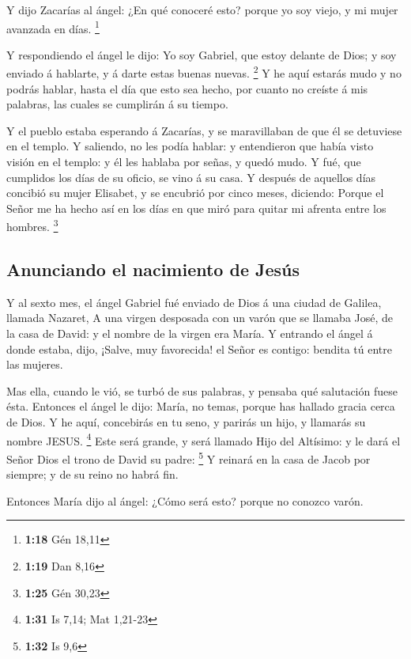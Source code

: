  Y dijo Zacarías al ángel: ¿En qué conoceré esto? porque yo
soy viejo, y mi mujer avanzada en días. \footnote{\textbf{1:18} Gén
  18,11}

 Y respondiendo el ángel le dijo: Yo soy Gabriel, que estoy
delante de Dios; y soy enviado á hablarte, y á darte estas buenas
nuevas. \footnote{\textbf{1:19} Dan 8,16}  Y he aquí
estarás mudo y no podrás hablar, hasta el día que esto sea hecho, por
cuanto no creíste á mis palabras, las cuales se cumplirán á su tiempo.

 Y el pueblo estaba esperando á Zacarías, y se maravillaban
de que él se detuviese en el templo.  Y saliendo, no les
podía hablar: y entendieron que había visto visión en el templo: y él
les hablaba por señas, y quedó mudo.  Y fué, que cumplidos
los días de su oficio, se vino á su casa.  Y después de
aquellos días concibió su mujer Elisabet, y se encubrió por cinco meses,
diciendo:  Porque el Señor me ha hecho así en los días en
que miró para quitar mi afrenta entre los hombres. \footnote{\textbf{1:25}
  Gén 30,23}

\hypertarget{anunciando-el-nacimiento-de-jesuxfas}{%
\subsection{Anunciando el nacimiento de
Jesús}\label{anunciando-el-nacimiento-de-jesuxfas}}

 Y al sexto mes, el ángel Gabriel fué enviado de Dios á una
ciudad de Galilea, llamada Nazaret,  A una virgen desposada
con un varón que se llamaba José, de la casa de David: y el nombre de la
virgen era María.  Y entrando el ángel á donde estaba,
dijo, ¡Salve, muy favorecida! el Señor es contigo: bendita tú entre las
mujeres.

 Mas ella, cuando le vió, se turbó de sus palabras, y
pensaba qué salutación fuese ésta.  Entonces el ángel le
dijo: María, no temas, porque has hallado gracia cerca de Dios.
 Y he aquí, concebirás en tu seno, y parirás un hijo, y
llamarás su nombre JESUS. \footnote{\textbf{1:31} Is 7,14; Mat 1,21-23}
 Este será grande, y será llamado Hijo del Altísimo: y le
dará el Señor Dios el trono de David su padre: \footnote{\textbf{1:32}
  Is 9,6}  Y reinará en la casa de Jacob por siempre; y de
su reino no habrá fin.

 Entonces María dijo al ángel: ¿Cómo será esto? porque no
conozco varón.

